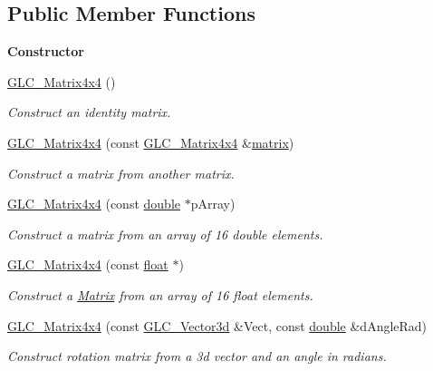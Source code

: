 \subsection*{Public Member Functions}
\begin{Indent}{\bf Constructor}\par
\begin{DoxyCompactItemize}
\item 
\hyperlink{class_g_l_c___matrix4x4_a3b8b51e01ffd63edc9316438539663b8}{G\-L\-C\-\_\-\-Matrix4x4} ()
\begin{DoxyCompactList}\small\item\em Construct an identity matrix. \end{DoxyCompactList}\item 
\hyperlink{class_g_l_c___matrix4x4_adc68dd8ad56d65441735d2a0dc40291a}{G\-L\-C\-\_\-\-Matrix4x4} (const \hyperlink{class_g_l_c___matrix4x4}{G\-L\-C\-\_\-\-Matrix4x4} \&\hyperlink{glext_8h_a7b24a3f2f56eb1244ae69dacb4fecb6f}{matrix})
\begin{DoxyCompactList}\small\item\em Construct a matrix from another matrix. \end{DoxyCompactList}\item 
\hyperlink{class_g_l_c___matrix4x4_a3e9b16ca514341e05ec2eda2e9ef2321}{G\-L\-C\-\_\-\-Matrix4x4} (const \hyperlink{_super_l_u_support_8h_a8956b2b9f49bf918deed98379d159ca7}{double} $\ast$p\-Array)
\begin{DoxyCompactList}\small\item\em Construct a matrix from an array of 16 double elements. \end{DoxyCompactList}\item 
\hyperlink{class_g_l_c___matrix4x4_ac1644be80355053e234a377cf0da6548}{G\-L\-C\-\_\-\-Matrix4x4} (const \hyperlink{_super_l_u_support_8h_a6a1bb6ed41f44b60e7bd83b0e9945aa7}{float} $\ast$)
\begin{DoxyCompactList}\small\item\em Construct a \hyperlink{class_matrix}{Matrix} from an array of 16 float elements. \end{DoxyCompactList}\item 
\hyperlink{class_g_l_c___matrix4x4_a75d15923495bf2bff929bac681359c02}{G\-L\-C\-\_\-\-Matrix4x4} (const \hyperlink{class_g_l_c___vector3d}{G\-L\-C\-\_\-\-Vector3d} \&Vect, const \hyperlink{_super_l_u_support_8h_a8956b2b9f49bf918deed98379d159ca7}{double} \&d\-Angle\-Rad)
\begin{DoxyCompactList}\small\item\em Construct rotation matrix from a 3d vector and an angle in radians. \end{DoxyCompactList}\item 

\end{DoxyCompactItemize}
\end{Indent}
